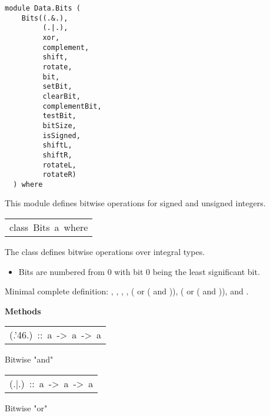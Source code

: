 \label{module:Data.Bits}
\haddockbeginheader
{\haddockverb\begin{verbatim}
module Data.Bits (
    Bits((.&.),
         (.|.),
         xor,
         complement,
         shift,
         rotate,
         bit,
         setBit,
         clearBit,
         complementBit,
         testBit,
         bitSize,
         isSigned,
         shiftL,
         shiftR,
         rotateL,
         rotateR)
  ) where\end{verbatim}}
\haddockendheader

This module defines bitwise operations for signed and unsigned
 integers.
\par

\begin{haddockdesc}
\item[\begin{tabular}{@{}l}
class\ Bits\ a\ where
\end{tabular}]\haddockbegindoc
The  class defines bitwise operations over integral types.
\par
\begin{itemize}
\item
 Bits are numbered from 0 with bit 0 being the least
  significant bit.
\par

\end{itemize}
Minimal complete definition: , , , ,
( or ( and )), ( or ( and )),
 and .
\par

\haddockpremethods{}\textbf{Methods}
\begin{haddockdesc}
\item[\begin{tabular}{@{}l}
(.{\char '46}.)\ ::\ a\ ->\ a\ ->\ a
\end{tabular}]\haddockbegindoc
Bitwise "and"
\par

\end{haddockdesc}
\begin{haddockdesc}
\item[\begin{tabular}{@{}l}
(.|.)\ ::\ a\ ->\ a\ ->\ a
\end{tabular}]\haddockbegindoc
Bitwise "or"
\par


\end{haddockdesc}
\end{haddockdesc}

